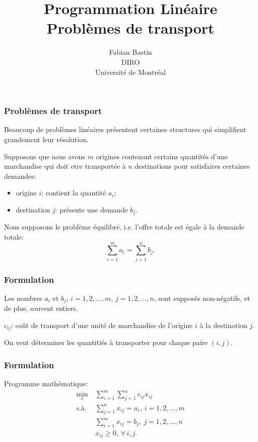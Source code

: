 \documentclass[usepdftitle=false]{beamer}
\title[Transport]{Programmation Linéaire\\Problèmes de transport}
\author[Fabian Bastin]{Fabian Bastin\\DIRO\\Université de Montréal}
\date{}
\begin{document}
\frame{\titlepage}


\begin{frame}
\frametitle{Problèmes de transport}

Beaucoup de problèmes linéaires présentent certaines structures qui simplifient grandement leur résolution.

\mbox{}

Supposons que nous avons $m$ origines contenant certains quantités d'une marchandise qui doit etre transportée à $n$ destinations pour satisfaires certaines demandes:
\begin{itemize}
\item
origine $i$: contient la quantité $a_i$;
\item
destination $j$: présente une demande $b_j$.
\end{itemize}

\mbox{}

Nous supposons le problème équilibré, i.e. l'offre totale est égale à la demande totale:
\[
\sum_{i = 1}^m a_i = \sum_{j = 1}^n b_j.
\]

\end{frame}

\begin{frame}
\frametitle{Formulation}

Les nombres $a_i$ et $b_j$, $i = 1,2,\ldots,m$, $j = 1,2,\ldots,n$, sont supposés non-négatifs, et de plus, souvent entiers.

\mbox{}

$c_{ij}$: coût de transport d'une unité de marchandise de l'origine $i$ à la destination $j$.

\mbox{}

On veut déterminer les quantitiés à transporter pour chaque paire $(i,j)$.

\end{frame}

\begin{frame}
\frametitle{Formulation}

Programme mathématique:
\begin{align*}
\min_x \ & \sum_{i = 1}^m \sum_{j = 1}^n c_{ij} x_{ij} \\
\mbox{s.à. } & \sum_{j = 1}^n x_{ij} = a_i, \ i = 1,2,\ldots,m \\
& \sum_{i = 1}^m x_{ij} = b_j,\ j = 1,2,\ldots,n \\
& x_{ij} \geq 0,\ \forall\, i, j.
\end{align*}

\end{frame}
\end{document}
